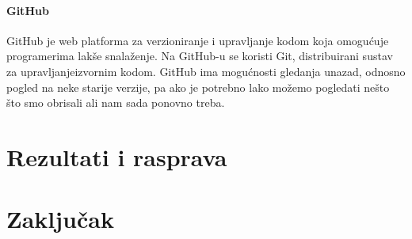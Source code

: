 \documentclass[diplomskirad]{fer}
\begin{document}
\subsubsection{GitHub}
GitHub je web platforma za verzioniranje i upravljanje kodom koja omogućuje programerima lakše snalaženje. Na GitHub-u se koristi Git, distribuirani sustav za upravljanjeizvornim kodom. GitHub ima mogućnosti gledanja unazad, odnosno pogled na neke starije verzije, pa ako je potrebno lako možemo pogledati nešto što smo obrisali ali nam sada ponovno treba. \cite{GIT}

\label{pog:glavni_dio}


\chapter{Rezultati i rasprava}
\label{pog:rezultati_i_rasprava}




\chapter{Zaključak}
\label{pog:zakljucak}








\end{document}
